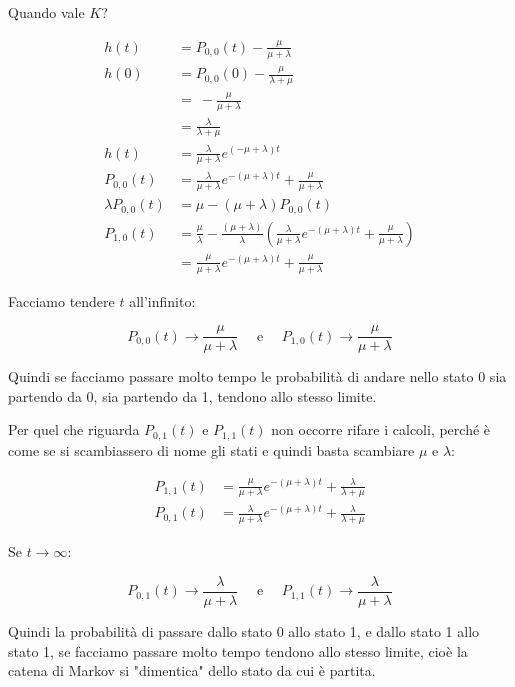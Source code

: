 \documentclass[a4paper,12pt]{book}
\begin{document}
Quando vale $ K $?

\begin{align*}
	h(t) & = P_{0,0}(t) - \frac{\mu}{\mu + \lambda} \\
	h(0) & = P_{0,0}(0) - \frac{\mu}{\lambda + \mu} \\
	& = \ - \frac{\mu}{\mu + \lambda} \\
	& = \frac{\lambda}{\lambda + \mu} \\
	h(t) & = \frac{\lambda}{\mu + \lambda}e^{(-\mu + \lambda)t} \\
	P_{0,0}(t) & = \frac{\lambda}{\mu + \lambda}e^{-(\mu + \lambda)t} + \frac{\mu}{\mu + \lambda} \\
	\lambda P_{0,0}(t) & = \mu - (\mu + \lambda) P_{0,0}(t) \\
	P_{1,0} (t) & = \frac{\mu}{\lambda} - \frac{(\mu + \lambda)}{\lambda} \left(\frac{\lambda}{\mu + \lambda} e^{-(\mu + \lambda)t} + \frac{\mu}{\mu + \lambda}\right) \\
	& = \frac{\mu}{\mu + \lambda}e^{-(\mu + \lambda)t} + \frac{\mu}{\mu + \lambda}
\end{align*}

Facciamo tendere $ t $ all'infinito:

$$ P_{0,0}(t) \to \frac{\mu}{\mu + \lambda} \quad \text{ e } \quad P_{1,0}(t) \to \frac{\mu}{\mu + \lambda}$$

Quindi se facciamo passare molto tempo le probabilità di andare nello stato 0 sia partendo da 0, sia partendo da 1, tendono allo stesso limite. 

Per quel che riguarda $ P_{0,1}(t) $ e $ P_{1,1}(t) $ non occorre rifare i calcoli, perché è come se si scambiassero di nome gli stati e quindi basta scambiare $\mu$ e $\lambda$:

\begin{align*}
	P_{1,1}(t) & = \frac{\mu}{\mu + \lambda} e^{-(\mu + \lambda)t} + \frac{\lambda}{\lambda + \mu} \\
	P_{0,1}(t) & = \frac{\lambda}{\mu + \lambda} e^{-(\mu + \lambda)t} + \frac{\lambda}{\lambda + \mu}
\end{align*}

Se $ t \to \infty $:

$$ P_{0,1}(t) \to \frac{\lambda}{\mu + \lambda} \quad \text{ e } \quad P_{1,1}(t) \to \frac{\lambda}{\mu + \lambda}$$

Quindi la probabilità di passare dallo stato 0 allo stato 1, e dallo stato 1 allo stato 1, se facciamo passare molto tempo tendono allo stesso limite, cioè la catena di Markov si "dimentica" dello stato da cui è partita. 
\end{document}
